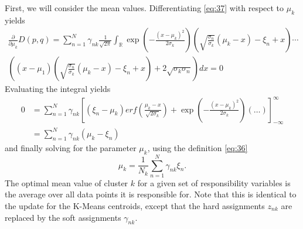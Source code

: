 First, we will consider the mean values.
Differentiating \eqref{eq:37} with respect to $\mu_k$ yields
\begin{multline}
  \label{eq:39}
  \frac{\partial }{\partial\mu_k}D(p,q) = \sum_{n=1}^N\gamma_{nk}\frac{1}{\sqrt{2\pi}}\int_\mathbb{R}\exp\left(-\frac{(x-\mu_k)^2}{2\sigma_k}\right)\left(\sqrt{\frac{\sigma_n}{\sigma_k}}(\mu_k-x)-\xi_n+x\right)\cdots\\ \left((x-\mu_1)\left(\sqrt{\frac{\sigma_n}{\sigma_k}}(\mu_k-x)-\xi_n+x\right)+2\sqrt{\sigma_k\sigma_n}\right)dx = 0
\end{multline}
Evaluating the integral  yields
\begin{align}
  \label{eq:40}
 0 &=\sum_{n=1}^N\gamma_{nk}\left[(\xi_n-\mu_k)erf\left(\frac{\mu_k-x}{\sqrt{2\sigma_k}}\right) + \exp\left(-\frac{(x-\mu_k)^2}{2\sigma_k}\right)\left(\ldots\right)\right]_{-\infty}^\infty\\
 &=\sum_{n=1}^N\gamma_{nk}(\mu_k-\xi_n)
\end{align}
and finally solving for the parameter $\mu_k$, using the definition \eqref{eq:36} 
\begin{equation}
  \label{eq:41}
  \mu_k = \frac{1}{N_k}\sum_{n=1}^N\gamma_{nk}\xi_n.
\end{equation}
The optimal mean value of cluster $k$ for a given set of responsibility variables is the average over all data points it is responsible for.
Note that this is identical to the update for the K-Means centroids, except that the hard assignments $z_{nk}$ are replaced by the soft assignments $\gamma_{nk}$.

